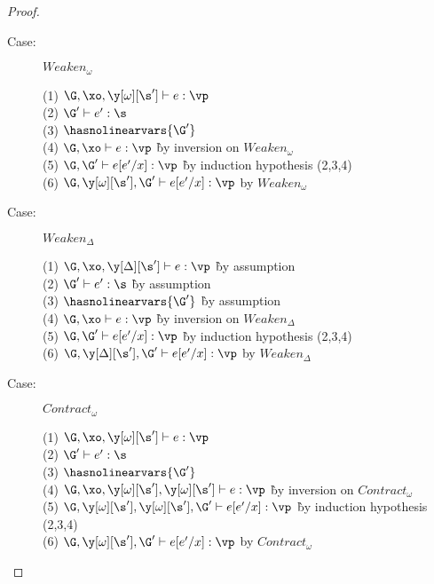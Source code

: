 \begin{proof}
\begin{description}
\item[Case:] $Weaken_\omega$
\begin{tabbing}
  (1) $\G, \xo, \y[\omega][\s'] \vdash e : \vp$\\
  (2) $\G' \vdash e' : \s$ \`\\
  (3) $\hasnolinearvars{\G'}$ \`\\
  (4) $\G, \xo \vdash e : \vp$ \` by inversion on $Weaken_\omega$\\
  (5) $\G, \G' \vdash e[e'/x] : \vp$ \` by induction hypothesis (2,3,4)\\
  (6) $\G, \y[\omega][\s'], \G' \vdash e[e'/x] : \vp$ by $Weaken_\omega$\\
\end{tabbing}

\item[Case:] $Weaken_\Delta$
\begin{tabbing}
  (1) $\G, \xo, \y[\Delta][\s'] \vdash e : \vp$ \` by assumption\\
  (2) $\G' \vdash e' : \s$ \` by assumption\\
  (3) $\hasnolinearvars{\G'}$ \` by assumption\\
  (4) $\G, \xo \vdash e : \vp$ \` by inversion on $Weaken_\Delta$\\
  (5) $\G, \G' \vdash e[e'/x] : \vp$ \` by induction hypothesis (2,3,4)\\
  (6) $\G, \y[\Delta][\s'], \G' \vdash e[e'/x] : \vp$ by $Weaken_\Delta$\\
\end{tabbing}

\item[Case:] $Contract_\omega$
\begin{tabbing}
  (1) $\G, \xo, \y[\omega][\s'] \vdash e : \vp$\\
  (2) $\G' \vdash e' : \s$ \`\\
  (3) $\hasnolinearvars{\G'}$\\
  (4) $\G, \xo, \y[\omega][\s'], \y[\omega][\s'] \vdash e : \vp$ \` by inversion on $Contract_\omega$\\
  (5) $\G, \y[\omega][\s'], \y[\omega][\s'], \G' \vdash e[e'/x] : \vp$ \` by induction hypothesis (2,3,4)\\
  (6) $\G, \y[\omega][\s'], \G' \vdash e[e'/x] : \vp$ by $Contract_\omega$\\
\end{tabbing}


\end{description}
\end{proof}
